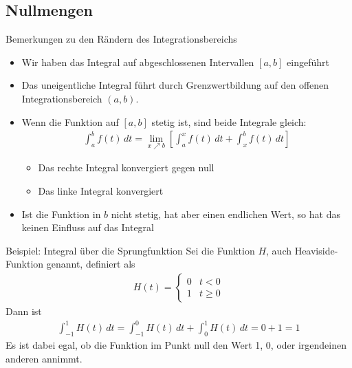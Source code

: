 \subsection{Nullmengen}
\begin{frame}{Bemerkungen zu den Rändern des Integrationsbereichs}
\begin{itemize}
    \item Wir haben das Integral auf abgeschlossenen Intervallen $[a,b]$ eingeführt
    \item Das uneigentliche Integral führt durch Grenzwertbildung auf den offenen Integrationsbereich $(a,b)$.
    \item Wenn die Funktion auf $[a,b]$ stetig ist, sind beide Integrale gleich:
    \begin{gather*}
        \int_a^b f(t)\,dt = \lim_{x\nearrow b} \left[\int_a^x f(t)\,dt + \int_x^b f(t)\,dt\right]
    \end{gather*}
    \begin{itemize}
        \item Das rechte Integral konvergiert gegen null
        \item Das linke Integral konvergiert
    \end{itemize}
    \pause
    \item Ist die Funktion in $b$ nicht stetig, hat aber einen endlichen Wert, so hat das keinen Einfluss auf das Integral
\end{itemize}
\end{frame}

\begin{frame}{Beispiel: Integral über die Sprungfunktion}
    Sei die Funktion $H$, auch Heaviside-Funktion genannt, definiert als
    \begin{gather*}
        H(t) = \begin{cases}
            0 & t<0\\1&t\ge 0
        \end{cases}
    \end{gather*}
    Dann ist
    \begin{gather*}
        \int_{-1}^1 H(t)\,dt
        = \int_{-1}^0 H(t)\,dt + \int_{0}^1 H(t)\,dt
        = 0+1 = 1
    \end{gather*}
    Es ist dabei egal, ob die Funktion im Punkt null den Wert 1, 0, oder irgendeinen anderen annimmt.
\end{frame}


